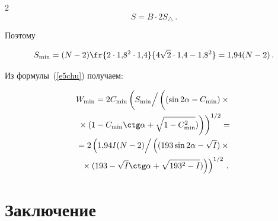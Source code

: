 \begin{multicols}{2}
\begin{equation*}


S=B\cdot 2S_{\triangle}\,.




\end{equation*}


Поэтому


\begin{equation*}


S_{\min} =(N-2)\fr{2\cdot 1{,}8^2\cdot1{,}4}{4\sqrt{2}\cdot1{,}4-


1{,}8^2}=1{,}94(N-2)\,.




\end{equation*}





Из формулы~(\ref{e5chu}) получаем:


\begin{multline*}


W_{\min} =2C_{\min}


\left(


{S_{\min}}\Big /\left(\vphantom{\sqrt{1-C^2_{\min}}}(


\sin2\alpha-C_{\min})\times{}\right.\right.\\


\left.\left.{}\times(1-


C_{\min}\ctg\alpha+\sqrt{1-C^2_{\min}})\right)\right)^{1/2}={}\\


{}=2


\left(


{1{,}94I(N-2)}\Big /\left(\vphantom{\sqrt{193^2-I}}


(193\sin2\alpha-\sqrt{I})\times{}\right.\right.\\


\left.\left.{}\times (193-


\sqrt{I}\ctg\alpha+\sqrt{193^2-I})\right)\right)^{1/2}\,.




\end{multline*}








\section{Заключение}






\end{multicols}
